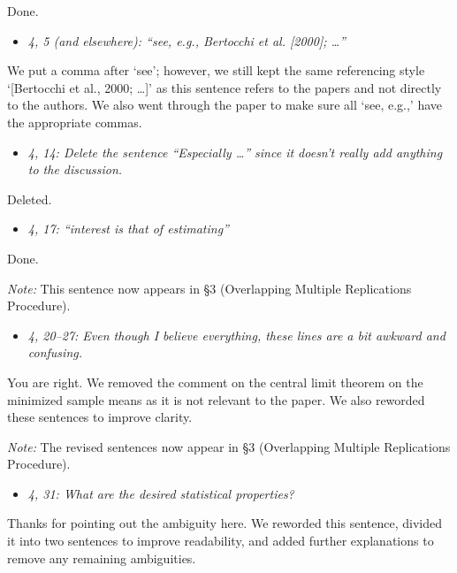 \documentclass[11pt,notitlepage,onecolumn]{article}
\newcommand{\noi}{\noindent}
\begin{document}
\noi
Done. 
\medskip 


\begin{itemize}
\item[] \textit{4, 5 (and elsewhere): ``see, e.g., Bertocchi et al. [2000]; \ldots ''}
\end{itemize}

\noi
We put a comma after `see'; however, we still kept the same referencing style `[Bertocchi et al., 2000; \ldots]' as this sentence refers to the papers and not directly to the authors. 
We also went through the paper to make sure all `see, e.g.,' have the appropriate commas.
\medskip 


\begin{itemize}
\item[] \textit{4, 14: Delete the sentence ``Especially \ldots '' since it doesn't really add anything to the discussion.}
\end{itemize}

\noi
Deleted.
\medskip 


\begin{itemize}
\item[] \textit{4, 17: ``interest is that of estimating''}
\end{itemize}

\noi
Done.  
\medskip 

\noi
{\it Note:}
This sentence now appears in \S 3 (Overlapping Multiple Replications Procedure). 
\medskip 


\begin{itemize}
\item[] \textit{4, 20--27: Even though I believe everything, these lines are a bit awkward and confusing.}
\end{itemize}

\noi
You are right. 
We removed the comment on the central limit theorem on the minimized sample means as it is not relevant to the paper. 
We also reworded these sentences to improve clarity. 
\medskip 

\noi
{\it Note:}
The revised sentences now appear in \S 3 (Overlapping Multiple Replications Procedure). 
\medskip 


\begin{itemize}
\item[] \textit{4, 31: What are the desired statistical properties?}
\end{itemize}

\noi
Thanks for pointing out the ambiguity here. 
We reworded this sentence, divided it into two sentences to improve readability, and added further explanations to remove any remaining ambiguities. 
\medskip 
\end{document}
